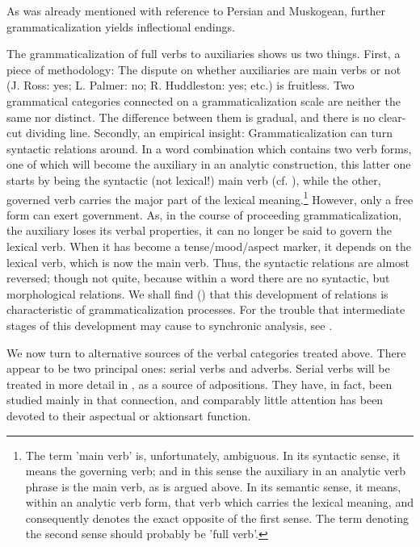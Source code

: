 As was already mentioned with reference to Persian and Muskogean, further grammaticalization yields inflectional endings.

The grammaticalization of full verbs to auxiliaries shows us two things. First, a piece of methodology: The dispute on whether auxiliaries are main verbs or not (J. Ross: yes; L. Palmer: no; R. Huddleston: yes; etc.) is fruitless. Two grammatical categories connected on a grammaticalization scale are neither the same nor distinct. The difference between them is gradual, and there is no clear-cut dividing line. Secondly, an empirical insight: Grammaticalization can turn syntactic relations around. In a word combination which contains two verb forms, one of which will become the auxiliary in an analytic construction, this latter one starts by being the syntactic (not lexical!) main verb (cf. \citealt[96f]{Givón1979}), while the other, governed verb carries the major part of the lexical meaning.\footnote{The term 'main verb' is, unfortunately, ambiguous. In its syntactic sense, it means the governing verb; and in this sense the auxiliary in an analytic verb phrase is the main verb, as is argued above. In its semantic sense, it means, within an analytic verb form, that verb which carries the lexical meaning, and consequently denotes the exact opposite of the first sense. The term denoting the second sense should probably be 'full verb'.} However, only a free form can exert government. As, in the course of proceeding grammaticalization, the auxiliary loses its verbal properties, it can no longer be said to govern the lexical verb.\label{page36} When it has become a tense/mood/aspect marker, it depends on the lexical verb, which is now the main verb. Thus, the syntactic relations are almost reversed; though not quite, because within a word there are no syntactic, but morphological relations. We shall find () that this development of relations is characteristic of grammaticalization processes. For the trouble that intermediate stages of this development may cause to synchronic analysis, see \citealt[155f]{Matthews1981}.

We now turn to alternative sources of the verbal categories treated above. There appear to be two principal ones: serial verbs and adverbs. Serial verbs will be treated in more detail in , as a source of adpositions. They have, in fact, been studied mainly in that connection, and comparably little attention has been devoted to their aspectual or aktionsart function.

